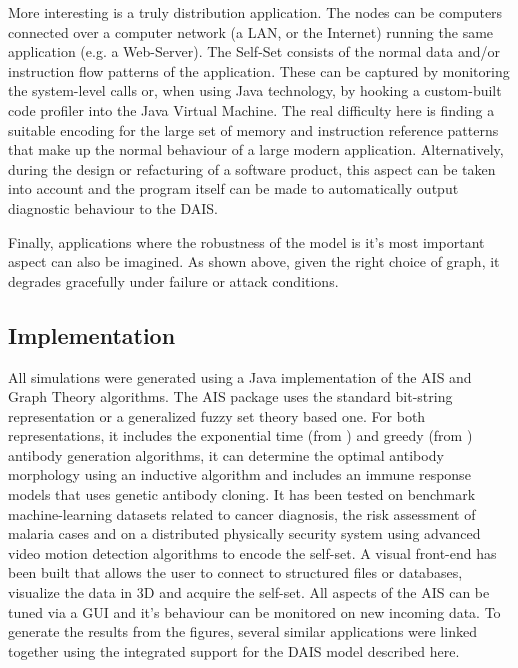 \documentclass{article}
\begin{document}
More interesting is a truly distribution application.
The nodes can be computers connected over a computer network (a LAN, or the Internet) running the same application (e.g. a Web-Server).
The Self-Set consists of the normal data and/or instruction flow patterns of the application.
These can be captured by monitoring the system-level calls or, when using Java technology, by hooking a custom-built code profiler into the Java Virtual Machine.
The real difficulty here is finding a suitable encoding for the large set of memory and instruction reference patterns that make up the normal behaviour of a large modern application.
Alternatively, during the design or refacturing of a software product, this aspect can be taken into account and the program itself can be made to automatically output diagnostic behaviour to the DAIS. 

Finally, applications where the robustness of the model is it's most important aspect can also be imagined.
As shown above, given the right choice of graph, it degrades gracefully under failure or attack conditions.

\subsection{Implementation}
All simulations were generated using a Java implementation of the AIS and Graph Theory algorithms.
The AIS package uses the standard bit-string representation or a generalized fuzzy set theory based one.
For both representations, it includes the exponential time (from \cite{forrest_first}) and greedy (from \cite{dhaeseleer_algorithms}) antibody generation algorithms, it can determine the optimal antibody morphology using an inductive algorithm and includes an immune response models that uses genetic antibody cloning.
It has been tested on benchmark machine-learning datasets related to cancer diagnosis, the risk assessment of malaria cases and on a distributed physically security system using advanced video motion detection algorithms to encode the self-set.
A visual front-end has been built that allows the user to connect to structured files or databases, visualize the data in 3D and acquire the self-set.
All aspects of the AIS can be tuned via a GUI and it's behaviour can be monitored on new incoming data.
To generate the results from the figures, several similar applications were linked together using the integrated support for the DAIS model described here.

\end{document}
